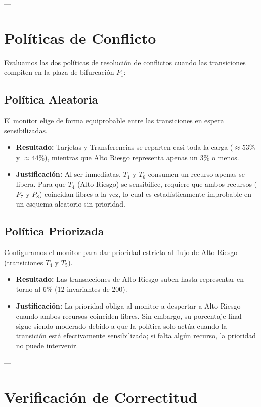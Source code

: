 \documentclass[12pt,a4paper]{article}
\begin{document}
---

\section{Políticas de Conflicto}

Evaluamos las dos políticas de resolución de conflictos cuando las transiciones compiten en la plaza de bifurcación $P_1$:

\subsection{Política Aleatoria}
El monitor elige de forma equiprobable entre las transiciones en espera sensibilizadas.
\begin{itemize}
    \item \textbf{Resultado:} Tarjetas y Transferencias se reparten casi toda la carga ($\approx 53\%$ y $\approx 44\%$), mientras que Alto Riesgo representa apenas un $3\%$ o menos.
    \item \textbf{Justificación:} Al ser inmediatas, $T_1$ y $T_6$ consumen un recurso apenas se libera. Para que $T_4$ (Alto Riesgo) se sensibilice, requiere que ambos recursos ($P_7$ y $P_8$) coincidan libres a la vez, lo cual es estadísticamente improbable en un esquema aleatorio sin prioridad.
\end{itemize}

\subsection{Política Priorizada}
Configuramos el monitor para dar prioridad estricta al flujo de Alto Riesgo (transiciones $T_4$ y $T_5$).
\begin{itemize}
    \item \textbf{Resultado:} Las transacciones de Alto Riesgo suben hasta representar en torno al $6\%$ (12 invariantes de 200).
    \item \textbf{Justificación:} La prioridad obliga al monitor a despertar a Alto Riesgo cuando ambos recursos coinciden libres. Sin embargo, su porcentaje final sigue siendo moderado debido a que la política solo actúa cuando la transición está efectivamente sensibilizada; si falta algún recurso, la prioridad no puede intervenir.
\end{itemize}

---

\section{Verificación de Correctitud}
\end{document}
